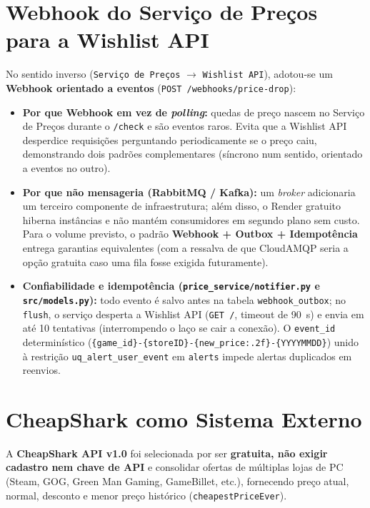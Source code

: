 \documentclass[11pt,a4paper]{article}
\begin{document}
\section{Webhook do Serviço de Preços para a Wishlist API}

No sentido inverso (\texttt{Serviço de Preços} $\rightarrow$ \texttt{Wishlist API}), adotou-se um \textbf{Webhook orientado a eventos} (\texttt{POST /webhooks/price-drop}):
\begin{itemize}
    \item \textbf{Por que Webhook em vez de \textit{polling}:} quedas de preço nascem no Serviço de Preços durante o \texttt{/check} e são eventos raros. Evita que a Wishlist API desperdice requisições perguntando periodicamente se o preço caiu, demonstrando dois padrões complementares (síncrono num sentido, orientado a eventos no outro).
    \item \textbf{Por que não mensageria (RabbitMQ / Kafka):} um \textit{broker} adicionaria um terceiro componente de infraestrutura; além disso, o Render gratuito hiberna instâncias e não mantém consumidores em segundo plano sem custo. Para o volume previsto, o padrão \textbf{Webhook + Outbox + Idempotência} entrega garantias equivalentes (com a ressalva de que CloudAMQP seria a opção gratuita caso uma fila fosse exigida futuramente).
    \item \textbf{Confiabilidade e idempotência (\texttt{price\_service/notifier.py} e \texttt{src/models.py}):} todo evento é salvo antes na tabela \texttt{webhook\_outbox}; no \texttt{flush}, o serviço desperta a Wishlist API (\texttt{GET /}, timeout de 90~s) e envia em até 10 tentativas (interrompendo o laço se cair a conexão). O \texttt{event\_id} determinístico (\texttt{\{game\_id\}-\{storeID\}-\{new\_price:.2f\}-\{YYYYMMDD\}}) unido à restrição \texttt{uq\_alert\_user\_event} em \texttt{alerts} impede alertas duplicados em reenvios.
\end{itemize}

\section{CheapShark como Sistema Externo}

A \textbf{CheapShark API v1.0} foi selecionada por ser \textbf{gratuita, não exigir cadastro nem chave de API} e consolidar ofertas de múltiplas lojas de PC (Steam, GOG, Green Man Gaming, GameBillet, etc.), fornecendo preço atual, normal, desconto e menor preço histórico (\texttt{cheapestPriceEver}).
\end{document}
